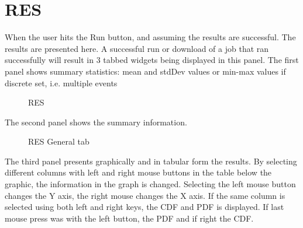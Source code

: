 \section{RES}

When the user hits the Run button, and assuming the results are successful. The results are presented here. 
A successful run or download of a job that ran successfully will result in 3 tabbed widgets being displayed in this panel. 
The first panel shows summary statistics: mean and stdDev values or min-max values if discrete set, i.e. multiple events
\begin{figure}[!htbp]
  \caption{RES}
  \label{fig:figure12}
\end{figure}

The second panel shows the summary information.
\begin{figure}[!htbp]
  \caption{RES General tab}
  \label{fig:figure13}
\end{figure}

The third panel presents graphically and in tabular form the results. By selecting different columns with left and right mouse buttons in the table below the graphic, 
the information in the graph is changed. Selecting the left mouse button changes the Y axis, the right mouse changes the X axis. If the same column is selected 
using both left and right keys, the CDF and PDF is displayed. If last mouse press was with the left button, the PDF and if right the CDF.

